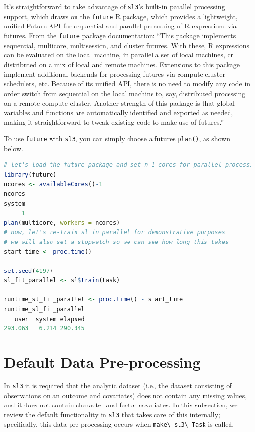 \documentclass[
  12pt, krantz2,
]{krantz}
\newcommand{\passthrough}[1]{#1}
\newcommand{\1}{\mathbbm{1}}
\theoremstyle{definition}
\theoremstyle{definition}
\theoremstyle{definition}
\theoremstyle{definition}
\theoremstyle{remark}
\begin{document}
It's straightforward to take advantage of \passthrough{\lstinline!sl3!}'s built-in parallel processing
support, which draws on the \href{https://cran.r-project.org/web/packages/future/index.html}{\passthrough{\lstinline!future!} R
package}, which
provides a lightweight, unified Future API for sequential and parallel
processing of R expressions via futures. From the \passthrough{\lstinline!future!} package
documentation: ``This package implements sequential, multicore, multisession, and cluster futures. With these, R expressions can be evaluated on the local
machine, in parallel a set of local machines, or distributed on a mix of local
and remote machines. Extensions to this package implement additional backends
for processing futures via compute cluster schedulers, etc. Because of its
unified API, there is no need to modify any code in order switch from
sequential on the local machine to, say, distributed processing on a remote
compute cluster. Another strength of this package is that global variables and
functions are automatically identified and exported as needed, making it
straightforward to tweak existing code to make use of futures.''

To use \passthrough{\lstinline!future!} with \passthrough{\lstinline!sl3!}, you can simply choose a futures \passthrough{\lstinline!plan()!}, as shown
below.

\begin{lstlisting}[language=R]
# let's load the future package and set n-1 cores for parallel processing
library(future)
ncores <- availableCores()-1
ncores
system 
     1 
plan(multicore, workers = ncores)
# now, let's re-train sl in parallel for demonstrative purposes
# we will also set a stopwatch so we can see how long this takes
start_time <- proc.time()

set.seed(4197)
sl_fit_parallel <- sl$train(task)

runtime_sl_fit_parallel <- proc.time() - start_time
runtime_sl_fit_parallel
   user  system elapsed 
293.063   6.214 290.345 
\end{lstlisting}

\hypertarget{default-data-pre-processing}{%
\section{Default Data Pre-processing}\label{default-data-pre-processing}}

In \passthrough{\lstinline!sl3!} it is required that the analytic dataset (i.e., the dataset
consisting of observations on an outcome and covariates) does not contain any
missing values, and it does not contain character and factor covariates.
In this subsection, we review the default functionality in \passthrough{\lstinline!sl3!} that takes care
of this internally; specifically, this data pre-processing occurs when
\passthrough{\lstinline!make\_sl3\_Task!} is called.
\end{document}
